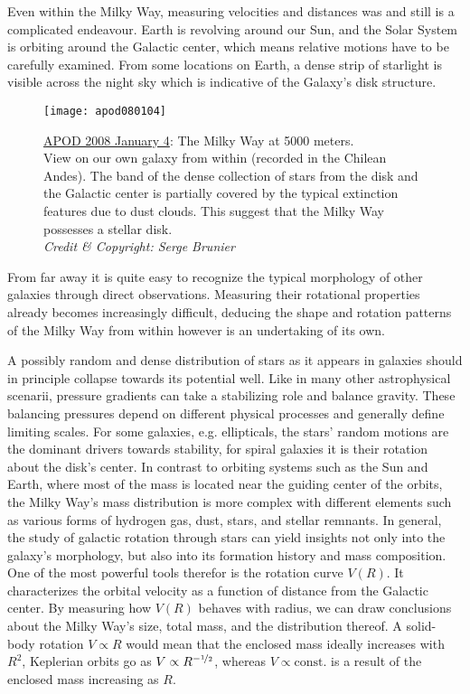 
Even within the Milky Way, measuring velocities and distances was and still is a
complicated endeavour.  Earth is revolving around our Sun, and the Solar System
is orbiting around the Galactic center, which means relative motions have to be
carefully examined.  From some locations on Earth, a dense strip of starlight is
visible across the night sky which is indicative of the Galaxy's disk structure.

\begin{figure}[h]
    \texttt{[image: apod080104]}
    \caption[The Milky Way: APOD 2008 January
    4]{\href{https://apod.nasa.gov/apod/ap080104.html}{APOD 2008 January 4}: The
    Milky Way at 5000 meters.\\
    View on our own galaxy from within (recorded in the Chilean Andes).  The
    band of the dense collection of stars from the disk and the Galactic center
    is partially covered by the typical extinction features due to dust
    clouds.  This suggest that the Milky Way possesses a stellar disk.\\
    \textit{Credit \& Copyright: Serge Brunier}}
\end{figure}

From far away it is quite easy to recognize the typical morphology of other
galaxies through direct observations.  Measuring their rotational properties already becomes
increasingly difficult, deducing the shape and rotation patterns of the Milky
Way from within however is an undertaking of its own.

A possibly random and dense distribution of stars as it appears in galaxies
should in principle collapse towards its potential well.  Like in many other
astrophysical scenarii, pressure gradients can take a stabilizing role and
balance gravity.  These balancing pressures depend on different physical
processes and generally define limiting scales.  For some galaxies, e.g.
ellipticals, the stars' random motions are the dominant drivers towards
stability, for spiral galaxies it is their rotation about the disk's center.  In
contrast to orbiting systems such as the Sun and Earth, where most of the mass
is located near the guiding center of the orbits, the Milky Way's mass
distribution is more complex with different elements such as various forms of
hydrogen gas, dust, stars, and stellar remnants.  In general, the study of
galactic rotation through stars can yield insights not only into the galaxy's
morphology, but also into its formation history and mass composition.  One of
the most powerful tools therefor is the rotation curve $V(R)$.  It characterizes
the orbital velocity as a function of distance from the Galactic center. By
measuring how $V(R)$ behaves with radius, we can draw conclusions about the
Milky Way's size, total mass, and the distribution thereof.  A solid-body
rotation $V \propto R$ would mean that the enclosed mass ideally increases with
$R^{2}$, Keplerian orbits go as $V \propto R^{-\mathrm{\nicefrac{1}{2}}}$, whereas $V \propto
\text{const.}$ is a result of the enclosed mass increasing as $R$.

